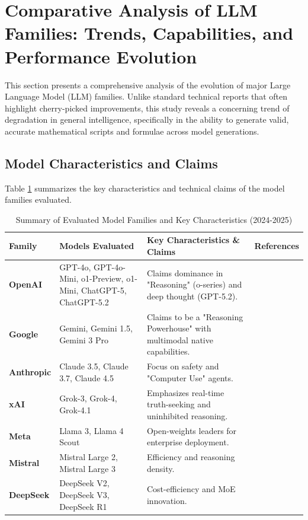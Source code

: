 \section{Comparative Analysis of LLM Families: Trends, Capabilities, and Performance Evolution}

This section presents a comprehensive analysis of the evolution of major Large Language Model (LLM) families. Unlike standard technical reports that often highlight cherry-picked improvements, this study reveals a concerning trend of degradation in general intelligence, specifically in the ability to generate valid, accurate mathematical scripts and formulae across model generations.

\subsection{Model Characteristics and Claims}
Table \ref{tab:model_characteristics} summarizes the key characteristics and technical claims of the model families evaluated.

\begin{table}[ht]
\centering
\caption{Summary of Evaluated Model Families and Key Characteristics (2024-2025)}
\label{tab:model_characteristics}
\begin{tabular}{|>{\bfseries}l|p{3.5cm}|p{5cm}|p{3cm}|}
\hline
\textbf{Family} & \textbf{Models Evaluated} & \textbf{Key Characteristics \& Claims} & \textbf{References} \\ \hline
OpenAI & GPT-4o, GPT-4o-Mini, o1-Preview, o1-Mini, ChatGPT-5, ChatGPT-5.2 & Claims dominance in "Reasoning" (o-series) and deep thought (GPT-5.2). & \cite{OpenAI2024GPT4o, OpenAI2024o1, OpenAI2025GPT5} \\ \hline
Google & Gemini, Gemini 1.5, Gemini 3 Pro & Claims to be a "Reasoning Powerhouse" with multimodal native capabilities. & \cite{Google2024Gemini15, Google2025Gemini3} \\ \hline
Anthropic & Claude 3.5, Claude 3.7, Claude 4.5 & Focus on safety and "Computer Use" agents. & \cite{Anthropic2024Claude35, Anthropic2025Claude45} \\ \hline
xAI & Grok-3, Grok-4, Grok-4.1 & Emphasizes real-time truth-seeking and uninhibited reasoning. & \cite{xAI2024Grok1, xAI2025Grok4} \\ \hline
Meta & Llama 3, Llama 4 Scout & Open-weights leaders for enterprise deployment. & \cite{Meta2024Llama3, Meta2025Llama4} \\ \hline
Mistral & Mistral Large 2, Mistral Large 3 & Efficiency and reasoning density. & \cite{Mistral2024Large, Mistral2025Large3} \\ \hline
DeepSeek & DeepSeek V2, DeepSeek V3, DeepSeek R1 & Cost-efficiency and MoE innovation. & \cite{DeepSeek2024V2, DeepSeek2025V3} \\ \hline
\end{tabular}
\end{table}

